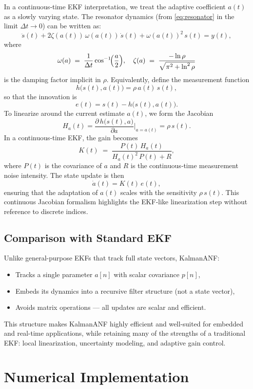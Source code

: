 \documentclass{article}
\begin{document}
In a continuous‐time EKF interpretation, we treat the adaptive coefficient \(a(t)\) as a slowly varying state.  The resonator dynamics (from \eqref{eq:resonator} in the limit \(\Delta t\to0\)) can be written as:
\[
\ddot s(t) + 2\zeta(a(t))\,\omega(a(t))\,\dot s(t) + \omega(a(t))^2\,s(t)
= y(t),
\]
where 
\[
\omega(a) \;=\; \frac{1}{\Delta t}\cos^{-1}\!\Bigl(\frac{a}{2}\Bigr),
\quad
\zeta(a) \;=\; \frac{-\ln\rho}{\sqrt{\pi^2 + \ln^2\rho}}
\]
is the damping factor implicit in \(\rho\).  Equivalently, define the measurement function
\[
h\bigl(s(t),a(t)\bigr)
= \rho\,a(t)\,s(t),
\]
so that the innovation is
\[
e(t)=s(t)-h\bigl(s(t),a(t)\bigr).
\]
To linearize around the current estimate \(a(t)\), we form the Jacobian
\[
H_a(t)
= \frac{\partial\,h\bigl(s(t),a\bigr)}{\partial a}\Bigg|_{a=a(t)}
= \rho\,s(t).
\]
In a continuous‐time EKF, the gain becomes
\[
K(t) \;=\; \frac{P(t)\,H_a(t)}{H_a(t)^2\,P(t) + R},
\]
where \(P(t)\) is the covariance of \(a\) and \(R\) is the continuous‐time measurement noise intensity.  The state update is then
\[
\dot a(t) = K(t)\,e(t),
\]
ensuring that the adaptation of \(a(t)\) scales with the sensitivity \(\rho\,s(t)\).  This continuous Jacobian formalism highlights the EKF‐like linearization step without reference to discrete indices.  

\subsection{Comparison with Standard EKF}

Unlike general-purpose EKFs that track full state vectors, KalmanANF:
\begin{itemize}
    \item Tracks a single parameter \( a[n] \) with scalar covariance \( p[n] \),
    \item Embeds its dynamics into a recursive filter structure (not a state vector),
    \item Avoids matrix operations — all updates are scalar and efficient.
\end{itemize}

This structure makes KalmanANF highly efficient and well-suited for embedded and real-time applications, while retaining many of the strengths of a traditional EKF: local linearization, uncertainty modeling, and adaptive gain control.

\section{Numerical Implementation}
\end{document}

